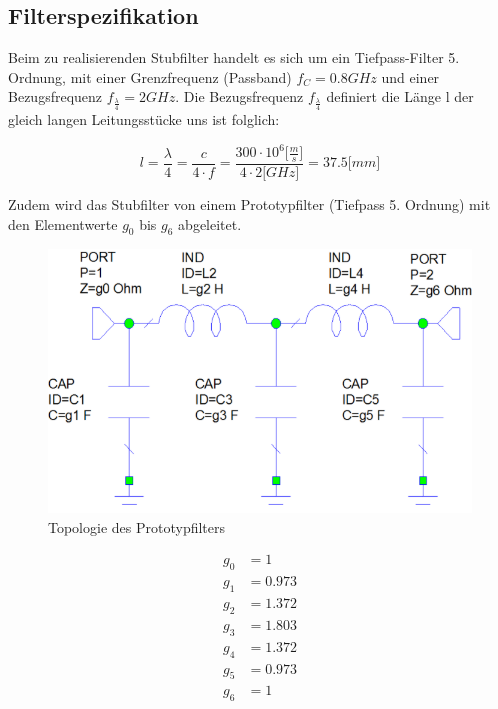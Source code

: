 \subsection{Filterspezifikation}

Beim zu realisierenden Stubfilter handelt es sich um ein Tiefpass-Filter 5. Ordnung, mit einer Grenzfrequenz (Passband) $f_C = 0.8GHz $ und einer Bezugsfrequenz $f_{\frac{\lambda}{4}} = 2GHz$. Die Bezugsfrequenz $f_{\frac{\lambda}{4}}$ definiert die Länge l der gleich langen Leitungsstücke uns ist folglich:

\begin{equation*}
l = \frac{\lambda}{4} = \frac{c}{4 \cdot f} = \frac{300\cdot 10^6 \lbrack\frac{m}{s}\rbrack}{4 \cdot 2 \lbrack GHz \rbrack} =37.5 \lbrack mm \rbrack
\end{equation*}

Zudem wird das Stubfilter von einem Prototypfilter (Tiefpass 5. Ordnung) 
mit den Elementwerte $g_0$ bis $g_6$ abgeleitet.

\begin{figure}[h!]
\centering
 	\includegraphics[width=\imagewidth]{images/Topologie_Prototyp.png}
 	\caption{Topologie des Prototypfilters}
 	\label{fig:Topologie_Prototyp.png}
\end{figure}

\begin{mdframed}
    \begin{align*} 
        g_0 &= 1 \\ 
        g_1 &= 0.973 \\ 
        g_2 &= 1.372 \\ 
        g_3 &= 1.803 \\ 
        g_4 &= 1.372 \\ 
        g_5 &= 0.973 \\ 
        g_6 &= 1 \\ 
    \end{align*} 
\end{mdframed}

